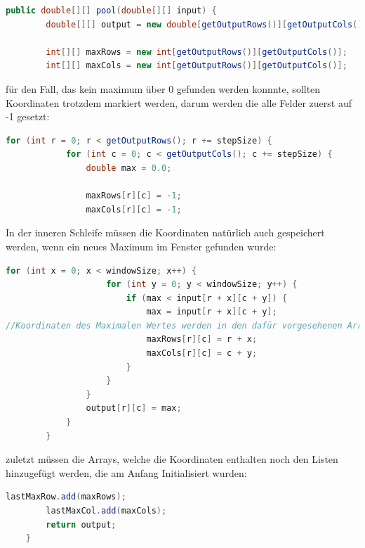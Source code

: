 \documentclass[12pt]{article}
\begin{document}
\begin{lstlisting}[language=Java]
public double[][] pool(double[][] input) {
        double[][] output = new double[getOutputRows()][getOutputCols()];

        int[][] maxRows = new int[getOutputRows()][getOutputCols()];
        int[][] maxCols = new int[getOutputRows()][getOutputCols()];   
\end{lstlisting}
für den Fall, das kein maximum über 0 gefunden werden konnnte, sollten Koordinaten trotzdem markiert werden, darum werden die alle Felder zuerst auf -1 gesetzt:
\begin{lstlisting}[language=Java]
        for (int r = 0; r < getOutputRows(); r += stepSize) {
            for (int c = 0; c < getOutputCols(); c += stepSize) {
                double max = 0.0;

                maxRows[r][c] = -1;
                maxCols[r][c] = -1;
\end{lstlisting}
In der inneren Schleife müssen die Koordinaten natürlich auch gespeichert werden, wenn ein neues Maximum im Fenster gefunden wurde:
\begin{lstlisting}[language=Java]
                for (int x = 0; x < windowSize; x++) {
                    for (int y = 0; y < windowSize; y++) {
                        if (max < input[r + x][c + y]) {
                            max = input[r + x][c + y];
//Koordinaten des Maximalen Wertes werden in den dafür vorgesehenen Arrays gespeichert
                            maxRows[r][c] = r + x;
                            maxCols[r][c] = c + y;
                        }
                    }
                }
                output[r][c] = max;
            }
        }
\end{lstlisting}
zuletzt müssen die Arrays, welche die Koordinaten enthalten noch den Listen hinzugefügt werden, die am Anfang Initialisiert wurden:
\begin{lstlisting}[language=Java]
        lastMaxRow.add(maxRows);
        lastMaxCol.add(maxCols);
        return output;
    }
\end{lstlisting}
\end{document}
